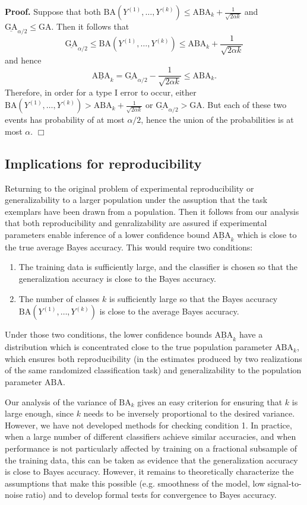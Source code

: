 \textbf{Proof.}
Suppose that both $\text{BA}(Y^{(1)},\hdots,
Y^{(k)}) \leq \text{ABA}_k + \frac{1}{\sqrt{2\alpha k}}$ and
$\underline{\text{GA}}_{\alpha/2} \leq \text{GA}.$
Then it follows that
\[
\underline{\text{GA}}_{\alpha/2} \leq \text{BA}(Y^{(1)},\hdots,
Y^{(k)}) \leq \text{ABA}_k + \frac{1}{\sqrt{2\alpha k}}
\]
and hence
\[
\underline{\text{ABA}}_k = \underline{\text{GA}}_{\alpha/2} -  \frac{1}{\sqrt{2\alpha k}} \leq \text{ABA}_k.
\]
Therefore, in order for a type I error to occur, either
$\text{BA}(Y^{(1)},\hdots, Y^{(k)}) > \text{ABA}_k
+ \frac{1}{\sqrt{2\alpha k}}$ or $\underline{\text{GA}}_{\alpha/2}
> \text{GA}.$ But each of these two events has probability of at most
$\alpha/2$, hence the union of the probabilities is at most
$\alpha$. $\Box$

\subsection{Implications for reproducibility}

Returning to the original problem of experimental reproducibility or
generalizability to a larger population under the assuption that the
task exemplars have been drawn from a population.  Then it follows
from our analysis that both reproducibility and genralizability are
assured if experimental parameters enable inference of a lower
confidence bound $\underline{\text{ABA}}_k$ which is close to the true
average Bayes accuracy.  This would require two conditions:
\begin{enumerate}
\item The training data is sufficiently large, and the classifier is
  chosen so that the generalization accuracy is close to the Bayes
  accuracy.
\item The number of classes $k$ is sufficiently large so that the
  Bayes accuracy $\text{BA}(Y^{(1)},\hdots, Y^{(k)})$ is close to the
  average Bayes accuracy.
\end{enumerate}
Under those two conditions, the lower confidence bounds
$\underline{\text{ABA}}_k$ have a distribution which is concentrated
close to the true population parameter $\text{ABA}_k$, which ensures
both reproducibility (in the estimates produced by two realizations of
the same randomized classification task) and generalizability to the
population parameter $\text{ABA}$.

Our analysis of the variance of $\text{BA}_k$ gives an easy criterion
for ensuring that $k$ is large enough, since $k$ needs to be inversely
proportional to the desired variance.  However, we have not developed
methods for checking condition 1.  In practice, when a large number of
different classifiers achieve similar accuracies, and when performance
is not particularly affected by training on a fractional subsample of
the training data, this can be taken as evidence that the
generalization accuracy is close to Bayes accuracy.  However, it
remains to theoretically characterize the assumptions that make this
possible (e.g. smoothness of the model, low signal-to-noise ratio) and
to develop formal tests for convergence to Bayes accuracy.

